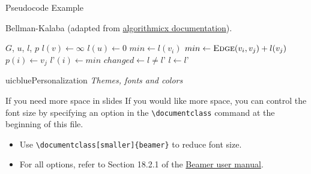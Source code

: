 \documentclass{beamer}
\newcommand{\hrefcol}[2]{\textcolor{uihteal}{\href{#1}{#2}}}
\begin{document}
\footlinecolor{}

\begin{frame}[fragile]{Pseudocode Example}
\begin{algorithm}[H]
\fontsize{8}{1}\selectfont
\caption{Bellman-Kalaba (adapted from \hrefcol{https://www.ctan.org/tex-archive/macros/latex/contrib/algorithmicx/algorithmicx.pdf}{algorithmicx documentation}).}
\begin{algorithmic}
\REQUIRE $G$, $u$, $l$, $p$
    \STATE $l(v) \leftarrow \infty$
\ENDFOR
\STATE $l(u) \leftarrow 0$
\REPEAT
        \STATE $min \leftarrow l(v_i)$
                \STATE $min \leftarrow \textsc{Edge}(v_i, v_j) + l(v_j)$ 
                \STATE $p(i) \leftarrow v_j$
            \ENDIF
        \ENDFOR
        \STATE $l’(i) \leftarrow min$
    \ENDFOR
    \STATE $changed \leftarrow l \not= l’$
    \STATE $l \leftarrow l’$
\end{algorithmic}
\end{algorithm}
\end{frame}



\begin{chapter}{uicblue}{Personalization}
\textit{Themes, fonts and colors}
\end{chapter}


\begin{frame}[fragile]{If you need more space in slides}
If you would like more space, you can control the font size by specifying an option in the \verb|\documentclass| command at the beginning of this file.
\begin{itemize}
    \item Use \verb|\documentclass[smaller]{beamer}| to reduce font size.
    \item For all options, refer to Section 18.2.1 of the \hrefcol{https://www.ctan.org/tex-archive/macros/latex/contrib/beamer/doc/beameruserguide.pdf}{Beamer user manual}.
\end{itemize}
\end{frame}
\end{document}
